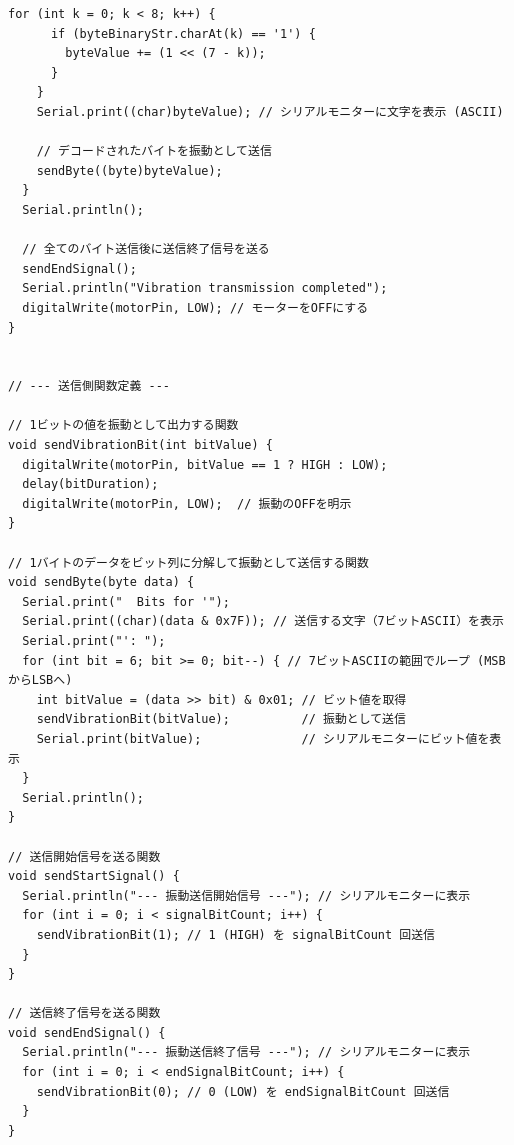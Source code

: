 \begin{lstlisting}[caption=vibration\_tx\_itg.ino]
    for (int k = 0; k < 8; k++) {
      if (byteBinaryStr.charAt(k) == '1') {
        byteValue += (1 << (7 - k));
      }
    }
    Serial.print((char)byteValue); // シリアルモニターに文字を表示 (ASCII)

    // デコードされたバイトを振動として送信
    sendByte((byte)byteValue);
  }
  Serial.println();

  // 全てのバイト送信後に送信終了信号を送る
  sendEndSignal();
  Serial.println("Vibration transmission completed");
  digitalWrite(motorPin, LOW); // モーターをOFFにする
}


// --- 送信側関数定義 ---

// 1ビットの値を振動として出力する関数
void sendVibrationBit(int bitValue) {
  digitalWrite(motorPin, bitValue == 1 ? HIGH : LOW);
  delay(bitDuration);
  digitalWrite(motorPin, LOW);  // 振動のOFFを明示
}

// 1バイトのデータをビット列に分解して振動として送信する関数
void sendByte(byte data) {
  Serial.print("  Bits for '");
  Serial.print((char)(data & 0x7F)); // 送信する文字（7ビットASCII）を表示
  Serial.print("': ");
  for (int bit = 6; bit >= 0; bit--) { // 7ビットASCIIの範囲でループ (MSBからLSBへ)
    int bitValue = (data >> bit) & 0x01; // ビット値を取得
    sendVibrationBit(bitValue);          // 振動として送信
    Serial.print(bitValue);              // シリアルモニターにビット値を表示
  }
  Serial.println();
}

// 送信開始信号を送る関数
void sendStartSignal() {
  Serial.println("--- 振動送信開始信号 ---"); // シリアルモニターに表示
  for (int i = 0; i < signalBitCount; i++) {
    sendVibrationBit(1); // 1 (HIGH) を signalBitCount 回送信
  }
}

// 送信終了信号を送る関数
void sendEndSignal() {
  Serial.println("--- 振動送信終了信号 ---"); // シリアルモニターに表示
  for (int i = 0; i < endSignalBitCount; i++) {
    sendVibrationBit(0); // 0 (LOW) を endSignalBitCount 回送信
  }
}
\end{lstlisting}

